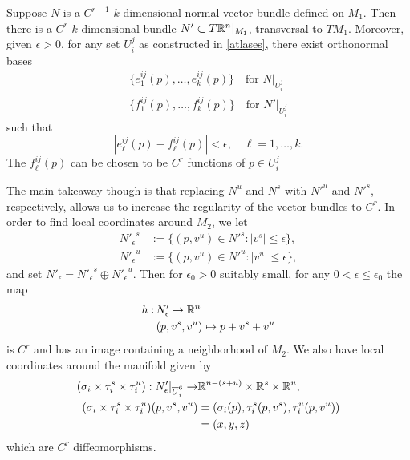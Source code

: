 \begin{prop}
	Suppose \(N\) is a \(C^{r-1}\)  \(k\)-dimensional normal vector bundle defined on \(M_1\). Then there is a \(C^r\) \(k\)-dimensional bundle \(N'\subset T\mathbb{R}^n |_{M_1}\), transversal to \(TM_1\). Moreover, given \(\epsilon > 0\), for any set \(U^j_i\) as constructed in \cref{atlases}, there exist orthonormal bases 
	\begin{align}
		\{e^{ij}_1(p), \ldots, e^{ij}_k(p)\} \quad \text{for } N|_{U^j_i} \\
		\{f^{ij}_1(p), \ldots, f^{ij}_k(p)\} \quad \text{for } N'|_{U^j_i} 
	\end{align}
	such that
	\begin{equation*}
		|e^{ij}_\ell(p) - f^{ij}_\ell(p) | < \epsilon, \quad \ell = 1,\ldots, k.
	\end{equation*}
	The \(f^{ij}_\ell(p)\) can be chosen to be \(C^r\) functions of \(p \in U^j_i\)
\end{prop}
The main takeaway though is that replacing \(N^u\) and \(N^s\) with \({N'}^u\) and \({N'}^s\), respectively, allows us to increase the regularity of the vector bundles to \(C^r\). In order to find local coordinates around \(M_2\), we let 
\begin{align}
	{N'_\epsilon}^s &:= \{(p, v^u) \in {N'}^s: |v^s| \leq \epsilon\}, \\
	{N'_\epsilon}^ u&:= \{(p, v^u) \in {N'}^u: |v^u| \leq \epsilon\},
\end{align}
and set \(N'_\epsilon = {N'_\epsilon}^s \oplus {N'_\epsilon}^u\). Then for \(\epsilon_0>0\) suitably small, for any \(0< \epsilon \leq \epsilon_0\) the map
\begin{equation*}
\begin{aligned}
	h:\, &N'_\epsilon  \to \mathbb{R}^n \\
	&(p, v^s, v^u) \mapsto p + v^s + v^u
\end{aligned}
\end{equation*}
is \(C^r\) and has an image containing a neighborhood of \(M_2\). We also have local coordinates around the manifold given by
\begin{equation*}
\begin{aligned}
	(\sigma_i \times \tau_i^s \times \tau_i^u) : N'_\epsilon |_{\overline U_i^6}  \to &\mathbb{R}^{n-(s+u)} \times \mathbb{R}^s \times \mathbb{R}^u, \\
	(\sigma_i \times \tau_i^s \times \tau_i^u) (p, v^s, v^u) &= (\sigma_i(p), \tau_i^s(p, v^s), \tau_i^u(p, v^u)) \\
	&= (x,y,z)
\end{aligned}
\end{equation*}
which are \(C^r\) diffeomorphisms.

